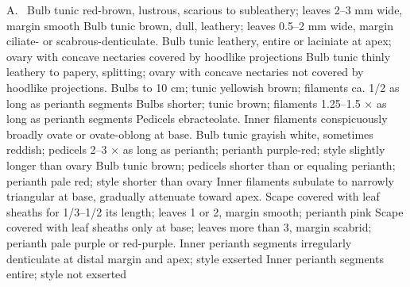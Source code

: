 \documentclass{ctexart}
\begin{document}
\begin{Key*}{A.~}
\alter Bulb tunic red-brown, lustrous, scarious to subleathery; leaves 2--3 mm wide, margin smooth
\alter Bulb tunic brown, dull, leathery; leaves 0.5--2 mm wide, margin ciliate- or scabrous-denticulate.
\alter Bulb tunic leathery, entire or laciniate at apex; ovary with concave nectaries covered by hoodlike projections
\alter Bulb tunic thinly leathery to papery, splitting; ovary with concave nectaries not covered by hoodlike projections.
\alter Bulbs to 10 cm; tunic yellowish brown; filaments ca. 1/2 as long as perianth segments
\alter Bulbs shorter; tunic brown; filaments 1.25--1.5 × as long as perianth segments
\alter Pedicels ebracteolate.
\alter Inner filaments conspicuously broadly ovate or ovate-oblong at base.
\alter Bulb tunic grayish white, sometimes reddish; pedicels 2--3 × as long as perianth; perianth purple-red; style slightly longer than ovary
\alter Bulb tunic brown; pedicels shorter than or equaling perianth; perianth pale red; style shorter than ovary
\alter Inner filaments subulate to narrowly triangular at base, gradually attenuate toward apex.
\alter Scape covered with leaf sheaths for 1/3--1/2 its length; leaves 1 or 2, margin smooth; perianth pink
\alter Scape covered with leaf sheaths only at base; leaves more than 3, margin scabrid; perianth pale purple or red-purple.
\alter Inner perianth segments irregularly denticulate at distal margin and apex; style exserted
\alter Inner perianth segments entire; style not exserted
\end{Key*}
\end{document}
